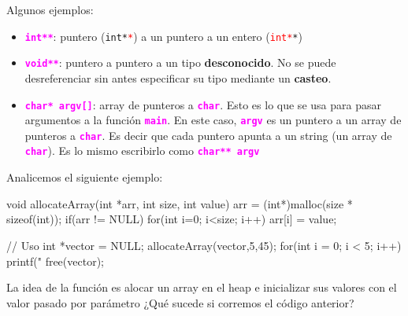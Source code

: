 \documentclass[]{scrartcl}
\newcommand{\hl}[1]{\textcolor{magenta}{\textbf{\texttt{#1}}}}
\begin{document}
Algunos ejemplos:
\begin{itemize}
  \item \hl{int**}: puntero (\texttt{int*\textcolor{red}{*}}) a un puntero a un entero (\texttt{\textcolor{red}{int*}*})
  \item \hl{void**}: puntero a puntero a un tipo \textbf{desconocido}. No se puede desreferenciar sin antes especificar su tipo mediante un \textbf{casteo}.
  \item \hl{char* argv[]}: array de punteros a \hl{char}. Esto es lo que se usa para pasar argumentos a la función \hl{main}. En este caso, \hl{argv} es un puntero a un array de punteros a \hl{char}. Es decir que cada puntero apunta a un string (un array de \hl{char}). Es lo mismo escribirlo como \hl{char** argv} 
        
\end{itemize}

\begin{center}
  \noindent {}
  \label{fig:doble-puntero}
\end{center}

Analicemos el siguiente ejemplo:

\begin{cbox}[]{}
  void allocateArray(int *arr, int size, int value) {
    arr = (int*)malloc(size * sizeof(int));
    if(arr != NULL) {
      for(int i=0; i<size; i++) {
        arr[i] = value;
      }
    }
  }
  
  // Uso
  int *vector = NULL;
  allocateArray(vector,5,45);
  for(int i = 0; i < 5; i++)
    printf("%
  free(vector);
\end{cbox}
\begin{exbox}
  La idea de la función es alocar un array en el heap e inicializar sus valores con el valor pasado por parámetro ¿Qué sucede si corremos el código anterior? 
\end{exbox}
\end{document}
